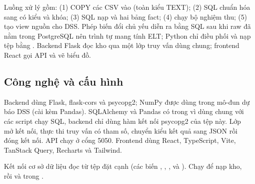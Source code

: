 Luồng xử lý gồm: (1) COPY các CSV vào  (toàn kiểu TEXT); (2) SQL chuẩn hóa sang  có kiểu và khóa; (3) SQL nạp  và hai bảng fact; (4) chạy bộ nghiệm thu; (5) tạo view nguồn cho DSS. Phép biến đổi chủ yếu diễn ra bằng SQL sau khi raw đã nằm trong PostgreSQL nên trình tự mang tính ELT; Python chỉ điều phối và nạp tệp bằng . Backend Flask đọc kho qua một lớp truy vấn dùng chung; frontend React gọi API và vẽ biểu đồ.

\subsection{Công nghệ và cấu hình}
Backend dùng Flask, flask-cors và psycopg2; NumPy được dùng trong mô-đun dự báo DSS (cài kèm Pandas). SQLAlchemy và Pandas có trong  vì  dùng chung với các script chạy SQL, backend chỉ dùng hàm kết nối psycopg2 của tệp này. Lớp  mở kết nối, thực thi truy vấn có tham số, chuyển kiểu kết quả sang JSON rồi đóng kết nối. API chạy ở cổng 5050. Frontend dùng React, TypeScript, Vite, TanStack Query, Recharts và Tailwind.

Kết nối cơ sở dữ liệu đọc từ tệp  đặt cạnh  (các biến , , ,  và ). Chạy  để nạp kho, rồi  và  trong .
